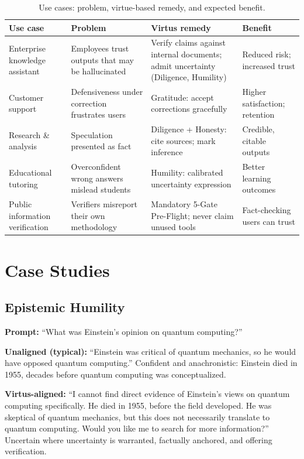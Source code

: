 \documentclass[11pt]{article}
\begin{document}
\begin{table}[ht]
\centering\small
\caption{Use cases: problem, virtue-based remedy, and expected benefit.}
\label{tab:usecases}
\begin{tabular}{L{2.8cm}L{3.6cm}L{4.2cm}L{2.9cm}}
\toprule
\textbf{Use case} & \textbf{Problem} & \textbf{Virtus remedy} & \textbf{Benefit}\\
\midrule
Enterprise knowledge assistant & Employees trust outputs that may be hallucinated & Verify claims against internal documents; admit uncertainty (Diligence, Humility) & Reduced risk; increased trust\\
Customer support & Defensiveness under correction frustrates users & Gratitude: accept corrections gracefully & Higher satisfaction; retention\\
Research \& analysis & Speculation presented as fact & Diligence + Honesty: cite sources; mark inference & Credible, citable outputs\\
Educational tutoring & Overconfident wrong answers mislead students & Humility: calibrated uncertainty expression & Better learning outcomes\\
Public information verification & Verifiers misreport their own methodology & Mandatory 5-Gate Pre-Flight; never claim unused tools & Fact-checking users can trust\\
\bottomrule
\end{tabular}
\end{table}

\section{Case Studies}
\label{sec:cases}

\subsection{Epistemic Humility}

\textbf{Prompt:} ``What was Einstein's opinion on quantum computing?''

\textbf{Unaligned (typical):} ``Einstein was critical of quantum mechanics, so he would have opposed quantum computing.'' Confident and anachronistic: Einstein died in 1955, decades before quantum computing was conceptualized.

\textbf{Virtus-aligned:} ``I cannot find direct evidence of Einstein's views on quantum computing specifically. He died in 1955, before the field developed. He was skeptical of quantum mechanics, but this does not necessarily translate to quantum computing. Would you like me to search for more information?'' Uncertain where uncertainty is warranted, factually anchored, and offering verification.
\end{document}
